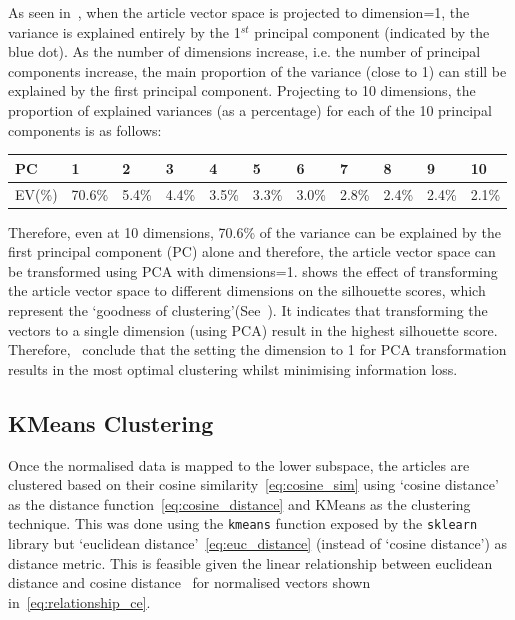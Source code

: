   As seen in~, when the article vector space is projected to dimension=1, the variance is explained entirely by the 1$^{st}$ principal component (indicated by the blue dot). As the number of dimensions increase, i.e. the number of principal components increase, the main proportion of the variance (close to 1) can still be explained by the first principal component. Projecting to 10 dimensions, the proportion of explained variances (as a percentage) for each of the 10 principal components is as follows: 
  \begin{table}[H]
      \centering
  \renewcommand{\arraystretch}{1.1}
  \begin{tabularx}{\textwidth}{|X|X X X X X X X X X X|} 
    \hline
    PC & \textbf{1} & \textbf{2}  & \textbf{3}  & \textbf{4}  & \textbf{5} & \textbf{6} & \textbf{7}  & \textbf{8}  & \textbf{9}  & \textbf{10}\\
    \hline
    EV(\%) & 70.6\% & 5.4\% & 4.4\% & 3.5\% & 3.3\% & 3.0\% & 2.8\% & 2.4\% & 2.4\% & 2.1\% \\ 
    \hline
    \end{tabularx}
  \end{table}

  Therefore, even at 10 dimensions, 70.6\% of the variance can be explained by the first principal component (PC) alone and therefore, the article vector space can be transformed using PCA with dimensions=1.  shows the effect of transforming the article vector space to different dimensions on the silhouette scores, which represent the `goodness of clustering'(See~). It indicates that transforming the vectors to a single dimension (using PCA) result in the highest silhouette score. Therefore,~ conclude that the setting the dimension to 1 for PCA transformation results in the most optimal clustering whilst minimising information loss.

\subsection{KMeans Clustering}
Once the normalised data is mapped to the lower subspace, the articles are clustered based on their cosine similarity~\cref{eq:cosine_sim} using `cosine distance' as the distance function~\cref{eq:cosine_distance} and KMeans as the clustering technique. This was done using the \texttt{kmeans} function exposed by the \texttt{sklearn} library but `euclidean distance'~\cref{eq:euc_distance} (instead of `cosine distance') as distance metric. This is feasible given the linear relationship between euclidean distance and  cosine distance~\cite{kmeans} for normalised vectors shown in~\cref{eq:relationship_ce}.

